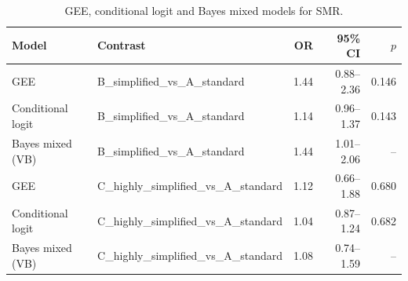 \begin{table}[H]
\caption{GEE, conditional logit and Bayes mixed models for SMR.}
\label{tab:sm:regression}
\centering
\begin{tabular}{llrrr}
\toprule
Model & Contrast & OR & 95\% CI & $p$ \\
\midrule
GEE & B_simplified_vs_A_standard & 1.44 & 0.88--2.36 & 0.146 \\
Conditional logit & B_simplified_vs_A_standard & 1.14 & 0.96--1.37 & 0.143 \\
Bayes mixed (VB) & B_simplified_vs_A_standard & 1.44 & 1.01--2.06 & -- \\
GEE & C_highly_simplified_vs_A_standard & 1.12 & 0.66--1.88 & 0.680 \\
Conditional logit & C_highly_simplified_vs_A_standard & 1.04 & 0.87--1.24 & 0.682 \\
Bayes mixed (VB) & C_highly_simplified_vs_A_standard & 1.08 & 0.74--1.59 & -- \\
\bottomrule
\end{tabular}
\end{table}
